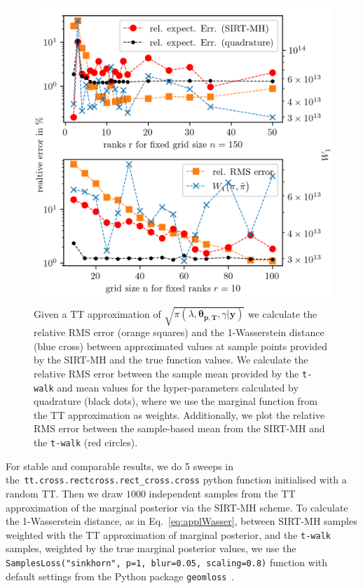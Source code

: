 \begin{figure}[ht!]%
	\includegraphics[]{findGridRank.png}
	\caption[Optimal rank and number of grid points for TT approximation.]{Given a TT approximation of $\sqrt{\pi( \lambda,\bm{\theta}_{\bm{p}, \bm{T}},\gamma  | \bm{y}) }$ we calculate the relative RMS error (orange squares) and the 1-Wasserstein distance (blue cross) between approximated values at sample points provided by the SIRT-MH and the true function values. We calculate the relative RMS error between the sample mean provided by the \texttt{t-walk} and mean values for the hyper-parameters calculated by quadrature (black dots), where we use the marginal function from the TT approximation as weights. Additionally, we plot the relative RMS error between the sample-based mean from the SIRT-MH and the \texttt{t-walk} (red circles).}
	\label{fig:FindRankGrid}
\end{figure}
For stable and comparable results, we do 5 sweeps in \linebreak the~\texttt{tt.cross.rectcross.rect\_cross.cross} python function initialised with a random TT.
Then we draw $1000$ independent samples from the TT approximation of the marginal posterior via the SIRT-MH scheme. 
To calculate the 1-Wasserstein distance, as in Eq.~\ref{eq:applWasser}, between SIRT-MH samples weighted with the TT approximation of marginal posterior, and the \texttt{t-walk} samples, weighted by the true marginal posterior values, we use the \texttt{SamplesLoss("sinkhorn", p=1, blur=0.05, scaling=0.8)} function with default settings from the Python package \texttt{geomloss}~\cite{Wassersteinaccess}.
